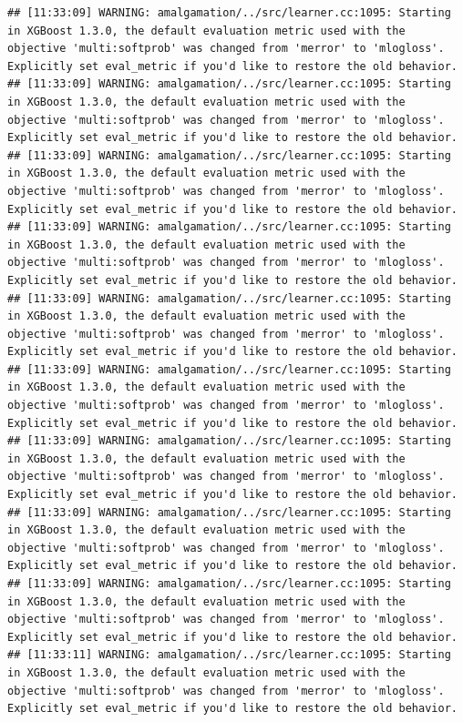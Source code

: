 \documentclass[
]{scrbook}
\begin{document}
\begin{verbatim}
## [11:33:09] WARNING: amalgamation/../src/learner.cc:1095: Starting in XGBoost 1.3.0, the default evaluation metric used with the objective 'multi:softprob' was changed from 'merror' to 'mlogloss'. Explicitly set eval_metric if you'd like to restore the old behavior.
## [11:33:09] WARNING: amalgamation/../src/learner.cc:1095: Starting in XGBoost 1.3.0, the default evaluation metric used with the objective 'multi:softprob' was changed from 'merror' to 'mlogloss'. Explicitly set eval_metric if you'd like to restore the old behavior.
## [11:33:09] WARNING: amalgamation/../src/learner.cc:1095: Starting in XGBoost 1.3.0, the default evaluation metric used with the objective 'multi:softprob' was changed from 'merror' to 'mlogloss'. Explicitly set eval_metric if you'd like to restore the old behavior.
## [11:33:09] WARNING: amalgamation/../src/learner.cc:1095: Starting in XGBoost 1.3.0, the default evaluation metric used with the objective 'multi:softprob' was changed from 'merror' to 'mlogloss'. Explicitly set eval_metric if you'd like to restore the old behavior.
## [11:33:09] WARNING: amalgamation/../src/learner.cc:1095: Starting in XGBoost 1.3.0, the default evaluation metric used with the objective 'multi:softprob' was changed from 'merror' to 'mlogloss'. Explicitly set eval_metric if you'd like to restore the old behavior.
## [11:33:09] WARNING: amalgamation/../src/learner.cc:1095: Starting in XGBoost 1.3.0, the default evaluation metric used with the objective 'multi:softprob' was changed from 'merror' to 'mlogloss'. Explicitly set eval_metric if you'd like to restore the old behavior.
## [11:33:09] WARNING: amalgamation/../src/learner.cc:1095: Starting in XGBoost 1.3.0, the default evaluation metric used with the objective 'multi:softprob' was changed from 'merror' to 'mlogloss'. Explicitly set eval_metric if you'd like to restore the old behavior.
## [11:33:09] WARNING: amalgamation/../src/learner.cc:1095: Starting in XGBoost 1.3.0, the default evaluation metric used with the objective 'multi:softprob' was changed from 'merror' to 'mlogloss'. Explicitly set eval_metric if you'd like to restore the old behavior.
## [11:33:09] WARNING: amalgamation/../src/learner.cc:1095: Starting in XGBoost 1.3.0, the default evaluation metric used with the objective 'multi:softprob' was changed from 'merror' to 'mlogloss'. Explicitly set eval_metric if you'd like to restore the old behavior.
## [11:33:11] WARNING: amalgamation/../src/learner.cc:1095: Starting in XGBoost 1.3.0, the default evaluation metric used with the objective 'multi:softprob' was changed from 'merror' to 'mlogloss'. Explicitly set eval_metric if you'd like to restore the old behavior.

\end{verbatim}
\end{document}
